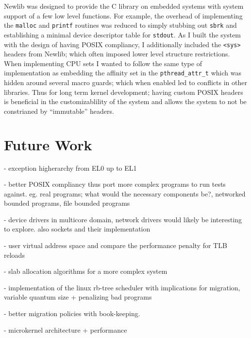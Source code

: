 \documentclass[11pt]{article}
\begin{document}
Newlib was designed to provide the C library on embedded systems \cite{newlib} with system support of a few low level functions.  For example, the overhead of implementing the \texttt{malloc} and \texttt{printf} routines was reduced to simply stubbing out \texttt{sbrk} and establishing a minimal device descriptor table for \texttt{stdout}.  As I built the system with the design of having POSIX compliancy, I additionally included the \texttt{<sys>} headers from Newlib; which often imposed lower level structure restrictions.  When implementing CPU sets I wanted to follow the same type of implementation as embedding the affinity set in the \texttt{pthread\_attr\_t} which was hidden around several macro guards; which when enabled led to conflicts in other libraries.  Thus for long term kernel development; having custom POSIX headers is beneficial in the customizablility of the system and allows the system to not be constrianed by ``immutable'' headers.

\section{Future Work}
\label{sec:future}
- exception higherarchy from EL0 up to EL1

- better POSIX compliancy thus port more complex programs to run tests against.
eg. real programs; what would the necessary components be?, networked bounded programs, file bounded programs

- device drivers in multicore domain, network drivers would likely be interesting to explore.  also sockets and their implementation

- user virtual address space and compare the performance penalty for TLB reloads

- slab allocation algorithms for a more complex system

- implementation of the linux rb-tree scheduler with implications for migration, variable quantum size + penalizing bad programs

- better migration policies with book-keeping.

- microkernel architecture + performance


\onecolumn
\begin{sloppypar}
	
	
\end{sloppypar}

\end{document}
